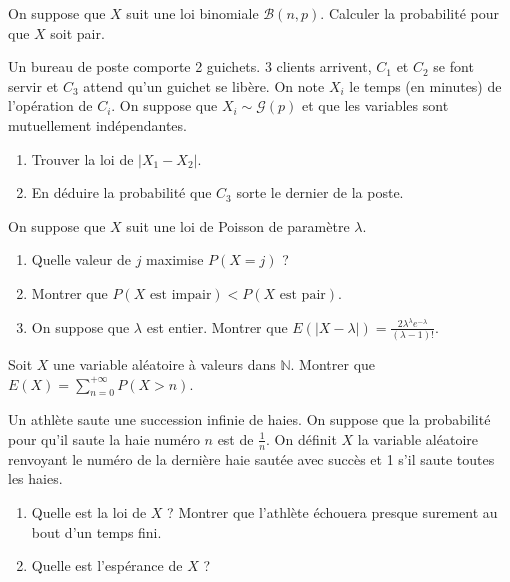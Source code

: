 \begin{exercice}
On suppose que $X$ suit une loi binomiale $\mathcal{B}(n,p)$. Calculer la probabilité pour que $X$ soit pair.
\end{exercice}

\begin{exercice}
Un bureau de poste comporte 2 guichets. 3 clients arrivent, $C_{1}$ et $C_{2}$ se font servir et $C_{3}$ attend qu'un guichet se libère. On note $X_{i}$ le temps (en minutes) de l'opération de $C_{i}$. On suppose que $X_{i}\sim\mathcal{G}(p)$ et que les variables sont mutuellement indépendantes.
\begin{enumerate}
    \item Trouver la loi de $|X_{1}-X_{2}|$.
    \item En déduire la probabilité que $C_{3}$ sorte le dernier de la poste.
\end{enumerate}
\end{exercice}

\begin{exercice}
On suppose que $X$ suit une loi de Poisson de paramètre $\lambda$.
\begin{enumerate}
    \item Quelle valeur de $j$ maximise $P(X=j)$ ?
    \item Montrer que $P(X \text{ est impair}) < P(X \text{ est pair})$.
    \item On suppose que $\lambda$ est entier. Montrer que $E(|X-\lambda|)=\frac{2\lambda^{\lambda}e^{-\lambda}}{(\lambda-1)!}$.
\end{enumerate}
\end{exercice}

\begin{exercice}
Soit $X$ une variable aléatoire à valeurs dans $\mathbb{N}$. Montrer que $E(X)=\sum_{n=0}^{+ \infty}P(X>n)$.
\end{exercice}

\begin{exercice}
Un athlète saute une succession infinie de haies. On suppose que la probabilité pour qu'il saute la haie numéro $n$ est de $\frac{1}{n}$. On définit $X$ la variable aléatoire renvoyant le numéro de la dernière haie sautée avec succès et 1 s'il saute toutes les haies.
\begin{enumerate}
    \item Quelle est la loi de $X$ ? Montrer que l'athlète échouera presque surement au bout d'un temps fini.
    \item Quelle est l'espérance de $X$ ?
\end{enumerate}
\end{exercice}

